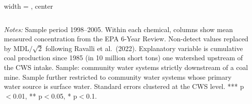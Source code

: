 \begin{table}[htbp]
\begin{adjustbox}{width = \textwidth, center}
\begin{tabular}{lcccc}
         \bottomrule
         
      \end{tabular}
      
      
      
   \end{adjustbox}
      {\tiny\linespread{1}\selectfont \par \raggedright 
   \textit{Notes:} Sample period 1998--2005. Within each chemical, columns show mean measured concentration from the EPA 6-Year Review. Non-detect values replaced by MDL$/\sqrt{2}$ following Ravalli et al.~(2022). Explanatory variable is cumulative coal production since 1985 (in 10 million short tons) one watershed upstream of the CWS intake. Sample: community water systems strictly downstream of a coal mine. Sample further restricted to community water systems whose primary water source is surface water. Standard errors clustered at the CWS level. *** p$<$0.01, ** p$<$0.05, * p$<$0.1.}
   
\end{table}


